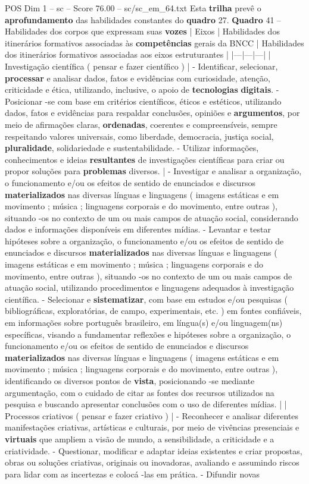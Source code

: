 \begin{textsample}{POS Dim 1 – sc – Score 76.00 – sc/sc\_em\_64.txt}
Esta \textbf{trilha} prevê o \textbf{aprofundamento} das habilidades constantes do \textbf{quadro} 27. \textbf{Quadro} 41 – Habilidades dos corpos que expressam suas \textbf{vozes} | Eixos | Habilidades dos itinerários formativos associadas às \textbf{competências} gerais da BNCC | Habilidades dos itinerários formativos associadas aos eixos estruturantes | |---|---|---| | Investigação científica ( pensar e fazer científico ) | - Identificar, selecionar, \textbf{processar} e analisar dados, fatos e evidências com curiosidade, atenção, criticidade e ética, utilizando, inclusive, o apoio de \textbf{tecnologias} \textbf{digitais}. - Posicionar -se com base em critérios científicos, éticos e estéticos, utilizando dados, fatos e evidências para respaldar conclusões, opiniões e \textbf{argumentos}, por meio de afirmações claras, \textbf{ordenadas}, coerentes e compreensíveis, sempre respeitando valores universais, como liberdade, democracia, justiça social, \textbf{pluralidade}, solidariedade e sustentabilidade. - Utilizar informações, conhecimentos e ideias \textbf{resultantes} de investigações científicas para criar ou propor soluções para \textbf{problemas} diversos. | - Investigar e analisar a organização, o funcionamento e/ou os efeitos de sentido de enunciados e discursos \textbf{materializados} nas diversas línguas e linguagens ( imagens estáticas e em movimento ; música ; linguagens corporais e do movimento, entre outras ), situando -os no contexto de um ou mais campos de atuação social, considerando dados e informações disponíveis em diferentes mídias. - Levantar e testar hipóteses sobre a organização, o funcionamento e/ou os efeitos de sentido de enunciados e discursos \textbf{materializados} nas diversas línguas e linguagens ( imagens estáticas e em movimento ; música ; linguagens corporais e do movimento, entre outras ), situando -os no contexto de um ou mais campos de atuação social, utilizando procedimentos e linguagens adequados à investigação científica. - Selecionar e \textbf{sistematizar}, com base em estudos e/ou pesquisas ( bibliográficas, exploratórias, de campo, experimentais, etc. ) em fontes confiáveis, em informações sobre português brasileiro, em língua(s) e/ou linguagem(ns) específicas, visando a fundamentar reflexões e hipóteses sobre a organização, o funcionamento e/ou os efeitos de sentido de enunciados e discursos \textbf{materializados} nas diversas línguas e linguagens ( imagens estáticas e em movimento ; música ; linguagens corporais e do movimento, entre outras ), identificando os diversos pontos de \textbf{vista}, posicionando -se mediante argumentação, com o cuidado de citar as fontes dos recursos utilizados na pesquisa e buscando apresentar conclusões com o uso de diferentes mídias. | | Processos criativos ( pensar e fazer criativo ) | - Reconhecer e analisar diferentes manifestações criativas, artísticas e culturais, por meio de vivências presenciais e \textbf{virtuais} que ampliem a visão de mundo, a sensibilidade, a criticidade e a criatividade. - Questionar, modificar e adaptar ideias existentes e criar propostas, obras ou soluções criativas, originais ou inovadoras, avaliando e assumindo riscos para lidar com as incertezas e colocá -las em prática. - Difundir novas 
\end{textsample}
